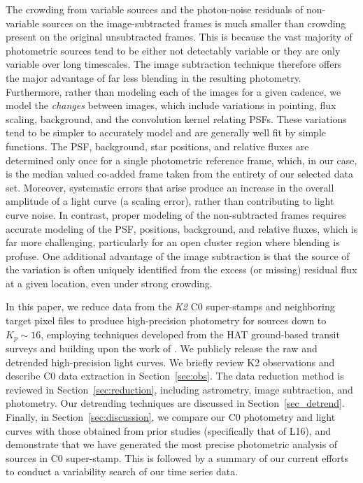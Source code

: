\documentclass[apjl]{emulateapj}
\begin{document}
The crowding from variable sources and the photon-noise residuals of
non-variable sources on the image-subtracted frames is much smaller than
crowding present on the original unsubtracted frames.  This is because
the vast majority of photometric sources tend to be either not
detectably variable or they are only variable over long timescales.  The
image subtraction technique therefore offers the major advantage of far
less blending in the resulting photometry.  Furthermore, rather than
modeling each of the images for a given cadence, we model the {\em
  changes} between images, which include variations in pointing, flux
scaling, background, and the convolution kernel relating PSFs.  These
variations tend to be simpler to accurately model and are generally well
fit by simple functions.  The PSF, background, star positions, and
relative fluxes are determined only once for a single photometric
reference frame, which, in our case, is the median valued co-added frame
taken from the entirety of our selected data set.  Moreover, systematic
errors that arise produce an increase in the overall amplitude of a
light curve (a scaling error), rather than contributing to light curve
noise.  In contrast, proper modeling of the non-subtracted frames
requires accurate modeling of the PSF, positions, background, and
relative fluxes, which is far more challenging, particularly for an
open cluster region where blending is profuse.  One additional advantage
of the image subtraction is that the source of the variation is often
uniquely identified from the excess (or missing) residual flux at a
given location, even under strong crowding.

In this paper, we reduce data from the \textit{K2} C0 super-stamps and
neighboring target pixel files to produce high-precision photometry for
sources down to $K_{p}\sim16$, employing techniques developed from the
HAT ground-based transit surveys \citep{Bakos:2010} and building upon
the work of \citet{Huang:2015}.  We publicly release the raw and
detrended high-precision light curves.  We briefly review K2
observations and describe C0 data extraction in Section~\ref{sec:obs}.
The data reduction method is reviewed in Section~\ref{sec:reduction},
including astrometry, image subtraction, and photometry.  Our detrending
techniques are discussed in Section~\ref{sec_detrend}.  Finally, in
Section~\ref{sec:discussion}, we compare our C0 photometry and light
curves with those obtained from prior studies (specifically that of L16),
and demonstrate that we have generated the most precise photometric
analysis of sources in C0 super-stamp.  This is followed by a summary of
our current efforts to conduct a variability search of our time series
data.
\end{document}
